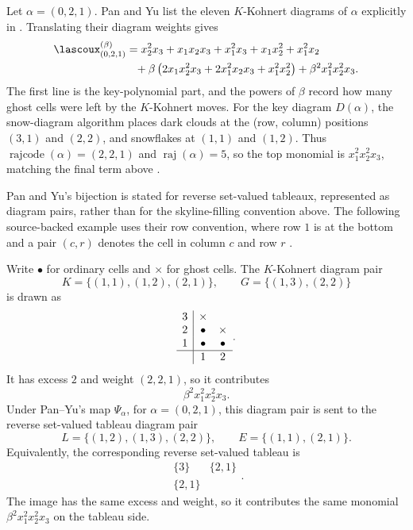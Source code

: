 \begin{example*}
Let $\alpha=(0,2,1)$.
Pan and Yu list the eleven $K$-Kohnert diagrams of $\alpha$ explicitly in
\cite[Ex.~2.13]{PanYu2024}.  Translating their diagram weights gives
\[
\begin{split}
\lascoux^{(\beta)}_{(0,2,1)}
&=x_2^2x_3+x_1x_2x_3+x_1^2x_3+x_1x_2^2+x_1^2x_2\\
&\phantom{=}
  +\beta\left(2x_1x_2^2x_3+2x_1^2x_2x_3+x_1^2x_2^2\right)
  +\beta^2x_1^2x_2^2x_3 .
\end{split}
\]
The first line is the key-polynomial part, and the powers of $\beta$
record how many ghost cells were left by the $K$-Kohnert moves.
For the key diagram $D(\alpha)$, the snow-diagram algorithm places dark
clouds at the (row, column) positions $(3,1)$ and $(2,2)$, and snowflakes at
$(1,1)$ and $(1,2)$.
Thus $\operatorname{rajcode}(\alpha)=(2,2,1)$ and
$\operatorname{raj}(\alpha)=5$, so the top monomial is
$x_1^2x_2^2x_3$, matching the final term above
\cite[Thm.~1.2]{PanYu2024}.
\end{example*}

\begin{example*}
Pan and Yu's bijection is stated for reverse set-valued tableaux, represented
as diagram pairs, rather than for the skyline-filling convention above.  The
following source-backed example uses their row convention, where row $1$ is at
the bottom and a pair $(c,r)$ denotes the cell in column $c$ and row $r$
\cite[Exs.~3.2 and~3.5]{PanYu2023}.

Write $\bullet$ for ordinary cells and $\times$ for ghost cells.  The
$K$-Kohnert diagram pair
\[
  K=\{(1,1),(1,2),(2,1)\},\qquad
  G=\{(1,3),(2,2)\}
\]
is drawn as
\[
\begin{array}{c|cc}
  3 & \times &        \\
  2 & \bullet & \times \\
  1 & \bullet & \bullet \\ \hline
    & 1 & 2
\end{array}.
\]
It has excess $2$ and weight $(2,2,1)$, so it contributes
\[
  \beta^2 x_1^2x_2^2x_3.
\]
Under Pan--Yu's map $\Psi_\alpha$, for $\alpha=(0,2,1)$, this diagram pair is
sent to the reverse set-valued tableau diagram pair
\[
  L=\{(1,2),(1,3),(2,2)\},\qquad
  E=\{(1,1),(2,1)\}.
\]
Equivalently, the corresponding reverse set-valued tableau is
\[
\begin{array}{cc}
  \{3\} & \{2,1\}\\
  \{2,1\} &
\end{array}.
\]
The image has the same excess and weight, so it contributes the same monomial
$\beta^2x_1^2x_2^2x_3$ on the tableau side.
\end{example*}




